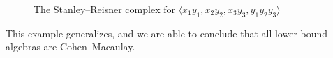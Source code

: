 \documentclass[ALCO,published]{cedram}
\numberwithin{equation}{section}
\newcommand{\1}{^{-1}}
\newcommand{\la}{\langle}
\newcommand{\ra}{\rangle}
\begin{document}
\begin{ex}
\begin{figure}
%                    
%	
%	
\caption{The Stanley--Reisner complex for $\la x_1y_1, x_2y_2, x_3y_3, y_1y_2y_3 \ra$}
\label{fig:3vertexball}
\end{figure}
\end{ex}

This example generalizes, and we are able to conclude that all lower bound algebras are Cohen--Macaulay. 
\end{document}
